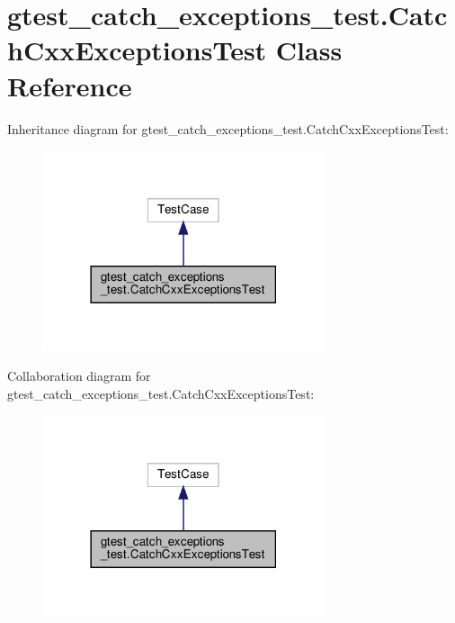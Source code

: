 \hypertarget{classgtest__catch__exceptions__test_1_1_catch_cxx_exceptions_test}{}\section{gtest\+\_\+catch\+\_\+exceptions\+\_\+test.\+Catch\+Cxx\+Exceptions\+Test Class Reference}
\label{classgtest__catch__exceptions__test_1_1_catch_cxx_exceptions_test}


Inheritance diagram for gtest\+\_\+catch\+\_\+exceptions\+\_\+test.\+Catch\+Cxx\+Exceptions\+Test\+:
\nopagebreak
\begin{figure}[H]
\begin{center}
\leavevmode
\includegraphics[width=234pt]{classgtest__catch__exceptions__test_1_1_catch_cxx_exceptions_test__inherit__graph}
\end{center}
\end{figure}


Collaboration diagram for gtest\+\_\+catch\+\_\+exceptions\+\_\+test.\+Catch\+Cxx\+Exceptions\+Test\+:
\nopagebreak
\begin{figure}[H]
\begin{center}
\leavevmode
\includegraphics[width=234pt]{classgtest__catch__exceptions__test_1_1_catch_cxx_exceptions_test__coll__graph}
\end{center}
\end{figure}
